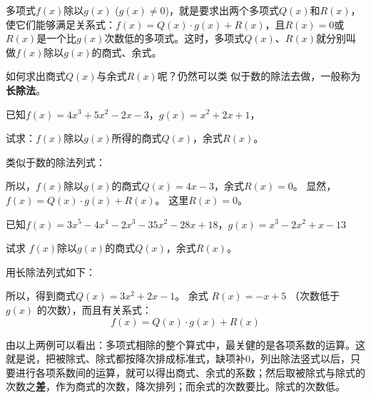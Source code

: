 多项式$f(x)$除以$g(x)$ ($g(x)\ne 0$)，就是要求出两个多项式$Q(x)$和$R(x)$，使它们能够满足关系式：$f(x)=Q(x)\cdot g(x)+R(x)$，且$R(x)=0$或$R(x)$是一个比$g(x)$次数低的多项式。这时，多项式$Q(x)$、$R(x)$就分别叫做$f(x)$除以$g(x)$的商式、余式。

如何求出商式$Q(x)$与余式$R(x)$呢？仍然可以类
似于数的除法去做，一般称为\textbf{长除法}。

\begin{example}
    已知$f(x)=4x^3+5x^2-2x-3$，$g (x) =x^2+2x+1$，
   
    试求：$f(x)$除以$g(x)$所得的商式$Q(x)$，余式$R(x)$。
\end{example}

\begin{solution}
    类似于数的除法列式：
    

    所以，$f(x)$除以$g(x)$的商式$Q(x)=4x-3$，余式$R (x) =0$。
    显然，$f(x)=Q(x)\cdot g(x)+R(x)$。
    这里$R(x)=0$。
\end{solution}

\begin{example}
已知$f(x)=3x^5-4x^4-2x^3-35x^2-28x+18$，$g (x) =x^3-2x^2+x-13$

试求 $f(x)$除以$g(x)$的商式$Q(x)$，余式$R(x)$。
\end{example}

\begin{solution}
    用长除法列式如下：


    所以，得到商式$Q(x)=3x^2+2x-1$。
    余式 $R(x)=-x+5$ （次数低于$g(x)$
    的次数），而且有关系式：
   \[ f (x) =Q (x) \cdot g (x) +R (x) \]

\end{solution}


    由以上两例可以看出：多项式相除的整个算式中，最关健的是各项系数的运算。这就是说，把被除式、除式都按降次排成标准式，缺项补0，列出除法竖式以后，只要进行各项系数间的运算，就可以得出商式、余式的系数；然后取被除式与除式的次数之\textbf{差}，作为商式的次数，降次排列；而余式的次数要比。除式的次数低。
    
